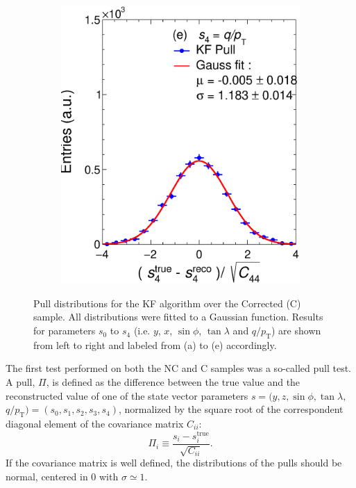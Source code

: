 \begin{figure}[t]
\begin{subfigure}{0.32\textwidth}
         \includegraphics[width=\textwidth]{figures/ch4-KF_NDGArLite/Toy/Corr/UnitKFEnd_p4.eps}
         \caption{}
         \label{fig:resp4KF_GArLite_Corr}
     \end{subfigure}
        \caption{Pull distributions for the KF algorithm over the Corrected (C) sample. All distributions were fitted to a Gaussian function. Results for parameters $s_0$ to $s_4$ (i.e. $y$, $x$, $\sin\phi$, $\tan\lambda$ and $q/p_{\text{T}}$) are shown from left to right and labeled from (a) to (e) accordingly. }
        \label{fig:ToyUnitKF_GArLite_Corr}
\end{figure}

The first test performed on both the NC and C samples was a so-called pull test. A pull, $\Pi$, is defined as the difference between the true value and the reconstructed value of one of the state vector parameters $s=(y,z,\sin{\phi},\tan{\lambda},$ $ q/p_{\text{T}})=(s_0,s_1,s_2,s_3,s_4)$, normalized by the square root of the correspondent diagonal element of the covariance matrix $C_{ii}$:
\begin{equation}
\label{eq:Pull}
    \Pi_i\equiv\frac{s_i-s_i^{\text{true}}}{\sqrt{C_{ii}}}.
\end{equation}
If the covariance matrix is well defined, the distributions of the pulls should be normal, centered in 0  with $\sigma\simeq1$.

